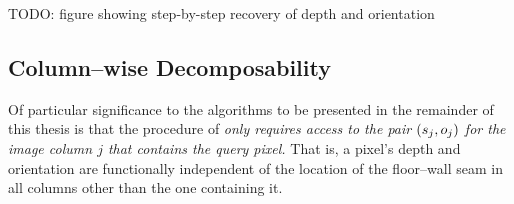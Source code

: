 TODO: figure showing step-by-step recovery of depth and orientation

\subsection{Column--wise Decomposability}
\label{sec:col-decomposability}

Of particular significance to the algorithms to be presented in the
remainder of this thesis is that the procedure of
 \textit{only requires access to the pair
  $(\seam_j,\WallOrient_j)$ for the image column $j$ that contains the
  query pixel.} That is, a pixel's depth and orientation are
functionally independent of the location of the floor--wall seam in
all columns other than the one containing it.
